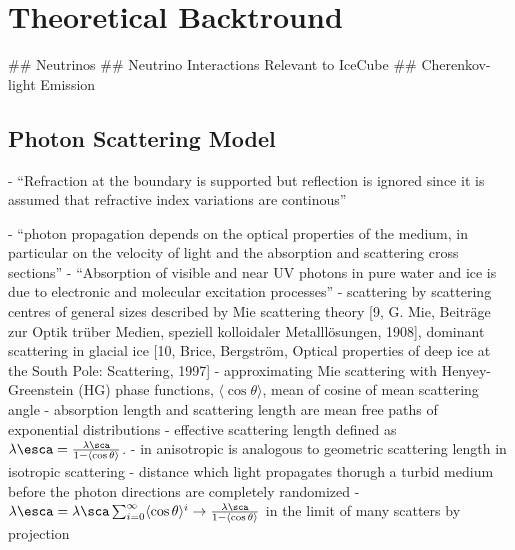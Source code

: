 
\section{Theoretical Backtround}
\label{sec:theoretical_background}

## Neutrinos
## Neutrino Interactions Relevant to IceCube
## Cherenkov-light Emission

\subsection{Photon Scattering Model}
\label{sec:scattering}

- ``Refraction at the boundary is supported but reflection is ignored since it is assumed that refractive index variations are continous'' \cite{lundberg}


\newcommand\meancostheta{\langle \cos \theta \rangle}
- ``photon propagation depends on the optical properties of the medium, in particular on the velocity of light and the absorption and scattering cross sections'' \cite{lundberg}
- ``Absorption of visible and near UV photons in pure water and ice is due to electronic and molecular excitation processes'' \cite{lundberg}
- scattering by scattering centres of general sizes described by Mie scattering theory [9, G. Mie, Beiträge zur Optik trüber Medien, speziell kolloidaler Metalllösungen, 1908], dominant scattering in glacial ice [10, Brice, Bergström, Optical properties of deep ice at the South Pole: Scattering, 1997] \cite{lundberg}
- approximating Mie scattering with Henyey-Greenstein (HG) phase functions, $\meancostheta$, mean of cosine of mean scattering angle \cite{lundberg}
- absorption length and scattering length are mean free paths of exponential distributions \cite{lundberg}
- effective scattering length defined as $\lambda\esca = \frac{\lambda\sca}{1 - \meancostheta}$. \cite{lundberg}
- in anisotropic is analogous to geometric scattering length in isotropic scattering \cite{lundberg}
- distance which light propagates thorugh a turbid medium before the photon directions are completely randomized \cite{lundberg}
- $\lambda\esca = \lambda\sca \sum_{i = 0}^\infty \meancostheta^i \rightarrow \frac{\lambda\sca}{1-\meancostheta}$ in the limit of many scatters by projection \cite{lundberg}

